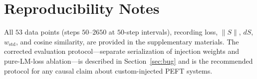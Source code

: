 \documentclass[11pt,a4paper]{article}
\newcommand{\wstd}{w_{\mathrm{std}}}
\begin{document}
\section{Reproducibility Notes}

All $53$ data points (steps $50$--$2650$ at $50$-step intervals), recording loss,
$\|S\|$, $dS$, $\wstd$, and cosine similarity, are provided in the supplementary
materials. The corrected evaluation protocol---separate serialization of injection
weights and pure-LM-loss ablation---is described in Section~\ref{sec:bug} and is the
recommended protocol for any causal claim about custom-injected PEFT systems.



\end{document}
